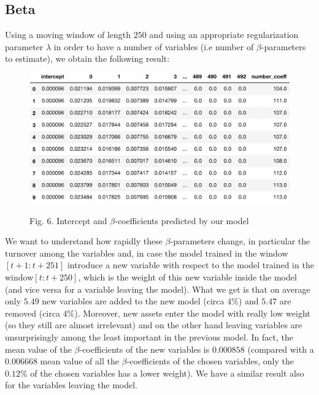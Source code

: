 \documentclass{article}%
\begin{document}
\subsection{Beta}
Using a moving window of length $250$ and using an appropriate regularization parameter $\lambda$ in order to have a number of variables (i.e number of $\beta$-parameters to estimate), we obtain the following result:
\begin{figure}[h!]
  \centering
  \includegraphics[scale=0.6]{beta_dataset.png}
  \begin{center}
\begin{small}
Fig. 6. Intercept and $\beta$-coefficients predicted by our model
\end{small}
\end{center}
  \label{beta_dataset}
\end{figure}
We want to understand how rapidly these $\beta$-parameters change, in particular the turnover among the variables and, in case the model trained in the window$[t+1:t+251]$  introduce a new variable with respect to the model trained in the window$[t:t+250]$, which is the weight of this new variable inside the model (and vice versa for a variable leaving the model). What we get is that on average only $5.49$ new variables are added to the new model (circa $4\%$) and $5.47$ are removed (circa $4\%$). Moreover, new assets enter the model with really low weight (so they still are almost irrelevant) and on the other hand leaving variables are unsurprisingly among the least important in the previous model. In fact, the mean value of the $\beta$-coefficients of the new variables is $0.000858$ (compared with a $0.006668$ mean value of all the $\beta$-coefficients of the chosen variables, only the $0.12\%$ of the chosen variables has a lower weight). We have a similar result also for the variables leaving the model.
\end{document}
